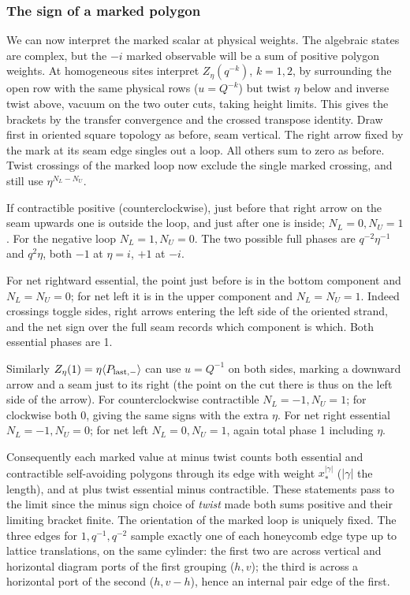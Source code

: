 \subsubsection{The sign of a marked polygon}

We can now interpret the marked scalar at physical weights. The algebraic
states are complex, but the $-i$ marked observable will be a sum of
positive polygon weights. At homogeneous sites interpret
\(Z_\eta(q^{-k})\), \(k=1,2\), by surrounding the open row with the same physical rows (\(u=Q^{-k}\)) but twist \(\eta\) below and inverse twist above, vacuum on the two outer cuts, taking height limits. This gives the brackets by the transfer convergence and the crossed transpose identity. Draw first in oriented square topology as before, seam vertical. The right arrow fixed by the mark at its seam edge singles out a loop. All others sum to zero as before. Twist crossings of the marked loop now exclude the single marked crossing, and still use \(\eta^{N_L-N_U}\).

If contractible positive (counterclockwise), just before that right arrow on the seam upwards one is outside the loop, and just after one is inside; \(N_L=0,N_U=1\). For the negative loop \(N_L=1,N_U=0\). The two possible full phases are \(q^{-2}\eta^{-1}\) and \(q^2\eta\), both \(-1\) at \(\eta=i\), \(+1\) at \(-i\).

For net rightward essential, the point just before is in the bottom component and \(N_L=N_U=0\); for net left it is in the upper component and \(N_L=N_U=1\). Indeed crossings toggle sides, right arrows entering the left side of the oriented strand, and the net sign over the full seam records which component is which. Both essential phases are 1.

Similarly \(Z_\eta(1)=\eta\langle P_{\rm last,-}\rangle\) can use \(u=Q^{-1}\) on both sides, marking a downward arrow and a seam just to its right (the point on the cut there is thus on the left side of the arrow). For counterclockwise contractible \(N_L=-1,N_U=1\); for clockwise both 0, giving the same signs with the extra \(\eta\). For net right essential \(N_L=-1,N_U=0\); for net left \(N_L=0,N_U=1\), again total phase 1 including \(\eta\).

Consequently each marked value at minus twist counts both essential and contractible self-avoiding polygons through its edge with weight \(x_*^{|\gamma|}\) (\(|\gamma|\) the length), and at plus twist essential minus contractible. These statements pass to the limit since the minus sign choice of \emph{twist} made both sums positive and their limiting bracket finite. The orientation of the marked loop is uniquely fixed. The three edges for \(1,q^{-1},q^{-2}\) sample exactly one of each honeycomb edge type up to lattice translations, on the same cylinder: the first two are across vertical and horizontal diagram ports of the first grouping (\(h,v\)); the third is across a horizontal port of the second (\(h,v-h\)), hence an internal pair edge of the first.

